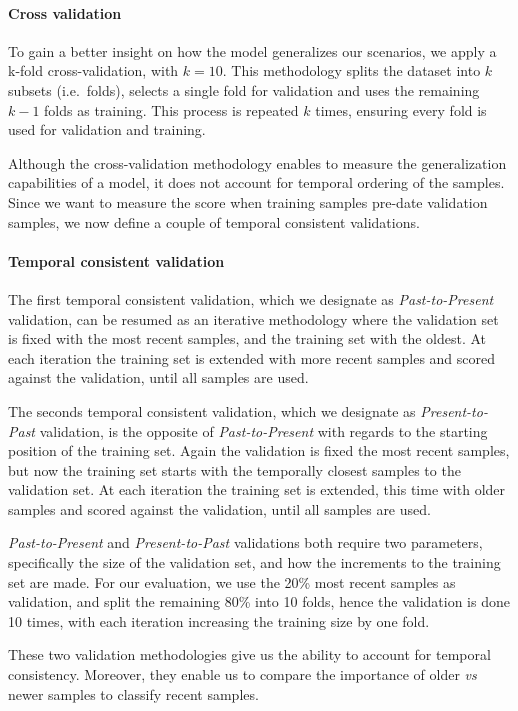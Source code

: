 \paragraph{Cross validation}
To gain a better insight on how the model generalizes our scenarios, we apply a k-fold cross-validation, with $k=10$. This methodology splits the dataset into $k$ subsets (i.e.\ folds), selects a single fold for validation and uses the remaining $k-1$ folds as training. This process is repeated $k$ times, ensuring every fold is used for validation and training.

Although the cross-validation methodology enables to measure the generalization capabilities of a model, it does not account for temporal ordering of the samples. Since we want to measure the score when training samples pre-date validation samples, we now define a couple of temporal consistent validations.

\paragraph{Temporal consistent validation}
The first temporal consistent validation, which we designate as \textit{Past-to-Present} validation, can be resumed as an iterative methodology where the validation set is fixed with the most recent samples, and the training set with the oldest. At each iteration the training set is extended with more recent samples and scored against the validation, until all samples are used.

The seconds temporal consistent validation, which we designate as \textit{Present-to-Past} validation, is the opposite of \textit{Past-to-Present} with regards to the starting position of the training set. Again the validation is fixed the most recent samples, but now the training set starts with the temporally closest samples to the validation set. At each iteration the training set is extended, this time with older samples and scored against the validation, until all samples are used.

\textit{Past-to-Present} and \textit{Present-to-Past} validations both require two parameters, specifically the size of the validation set, and how the increments to the training set are made. For our evaluation, we use the 20\% most recent samples as validation, and split the remaining 80\% into 10 folds, hence the validation is done 10 times, with each iteration increasing the training size by one fold.

These two validation methodologies give us the ability to account for temporal consistency. Moreover, they enable us to compare the importance of older \textit{vs} newer samples to classify recent samples.

